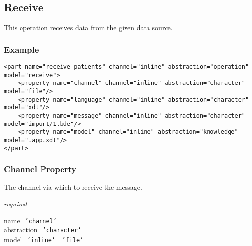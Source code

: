 %
%
%
%
%
%

\subsection{Receive}
\label{receive_heading}

This operation receives data from the given data source.

\subsubsection{Example}

\begin{scriptsize}
    \begin{verbatim}
<part name="receive_patients" channel="inline" abstraction="operation" model="receive">
    <property name="channel" channel="inline" abstraction="character" model="file"/>
    <property name="language" channel="inline" abstraction="character" model="xdt"/>
    <property name="message" channel="inline" abstraction="character" model="import/1.bde"/>
    <property name="model" channel="inline" abstraction="knowledge" model=".app.xdt"/>
</part>
    \end{verbatim}
\end{scriptsize}

\subsubsection{Channel Property}

The channel via which to receive the message.

\emph{required}

name=\texttt{'channel'}\\
abstraction=\texttt{'character'}\\
model=\texttt{'inline' \vline\ 'file'}

